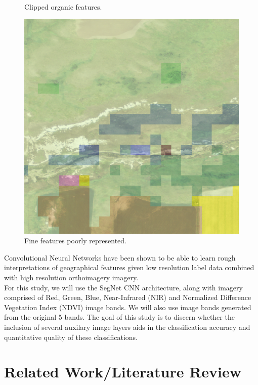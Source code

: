 \documentclass[12pt]{article}
\begin{document}
\begin{center}
\begin{figure}[!htb]
      \caption{Clipped organic features.}
    \endminipage\hfill
      \includegraphics[width=\linewidth]{images/poor_labels_3.png}
      \caption{Fine features poorly represented.}   
    \endminipage 
  \end{figure}
\end{center}


Convolutional Neural Networks have been shown to be able to learn rough interpretations of geographical features given low resolution label data combined with high resolution orthoimagery imagery. 
\\

For this study, we will use the SegNet CNN architecture, along with imagery comprised of Red, Green, Blue, Near-Infrared (NIR) and Normalized Difference Vegetation Index (NDVI) image bands. We will also use image bands generated from the original 5 bands. The goal of this study is to discern whether the inclusion of several auxilary image layers aids in the classification accuracy and quantitative quality of these classifications.



\section{Related Work/Literature Review}
\end{document}
